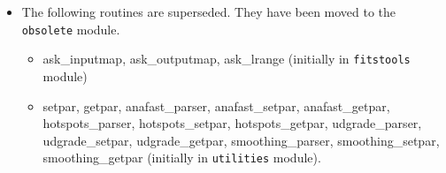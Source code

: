 \documentclass[12pt,twoside]{article}
\begin{document}
{\begin{itemize}
\item The following routines are superseded. They have been moved to the
{\tt obsolete} module.
\begin{itemize}
\item ask\_inputmap, ask\_outputmap, ask\_lrange (initially in {\tt fitstools} module)
\item setpar, getpar, anafast\_parser, anafast\_setpar, anafast\_getpar,
hotspots\_parser, hotspots\_setpar, hotspots\_getpar, udgrade\_parser,
udgrade\_setpar, udgrade\_getpar, smoothing\_parser, smoothing\_setpar,
smoothing\_getpar (initially in {\tt utilities} module).
\end{itemize}

\end{itemize}
} %
\end{document}
